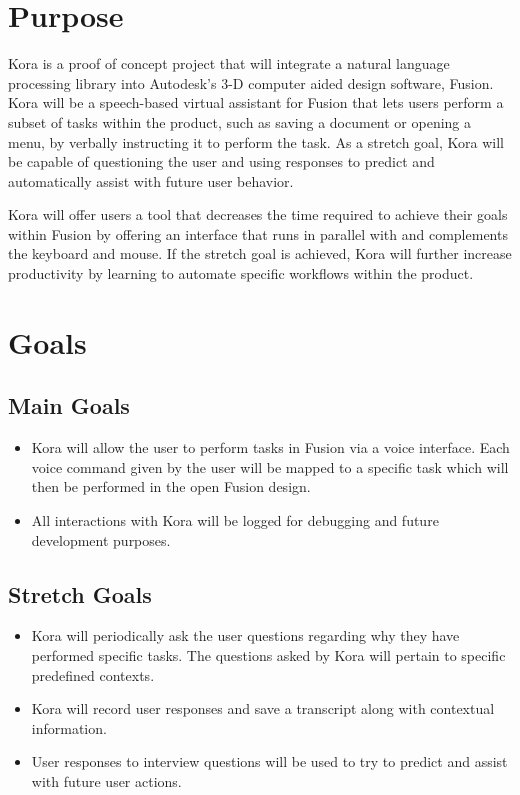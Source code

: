 \documentclass[onecolumn, draftclsnofoot,10pt, compsoc]{IEEEtran}
\begin{document}
\section{Purpose}
	Kora is a proof of concept project that will integrate a natural language processing library into Autodesk's 3-D computer aided design software, Fusion.
	Kora will be a speech-based virtual assistant for Fusion that lets users perform a subset of tasks within the product, such as saving a document or opening a menu, by verbally instructing it to perform the task.
	As a stretch goal, Kora will be capable of questioning the user and using responses to predict and automatically assist with future user behavior.
	
	Kora will offer users a tool that decreases the time required to achieve their goals within Fusion by offering an interface that runs in parallel with and complements the keyboard and mouse.
	If the stretch goal is achieved, Kora will further increase productivity by learning to automate specific workflows within the product.

\section{Goals}
	\subsection{Main Goals}
		\begin{itemize}
			 \item
		 	Kora will allow the user to perform tasks in Fusion via a voice interface.
			Each voice command given by the user will be mapped to a specific task which will then be performed in the open Fusion design.
			
			\item
			All interactions with Kora will be logged for debugging and future development purposes.
			
		\end{itemize}
	\subsection{Stretch Goals}
		\begin{itemize}
			\item
			Kora will periodically ask the user questions regarding why they have performed specific tasks.
			The questions asked by Kora will pertain to specific predefined contexts.
			
			\item
			Kora will record user responses and save a transcript along with contextual information.
			
			\item
			User responses to interview questions will be used to try to predict and assist with future user actions.
		\end{itemize}
\end{document}
